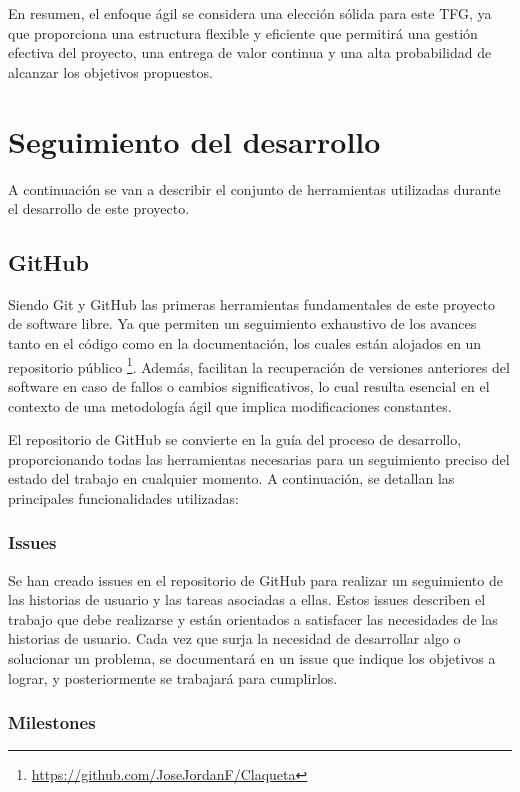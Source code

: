 En resumen, el enfoque ágil se considera una elección sólida para este TFG, ya que proporciona una estructura flexible y eficiente que permitirá una gestión efectiva del proyecto, una entrega de valor continua y una alta probabilidad de alcanzar los objetivos propuestos.


\section{Seguimiento del desarrollo}

A continuación se van a describir el conjunto de herramientas utilizadas durante el desarrollo de este proyecto.

\subsection{GitHub}

Siendo Git y GitHub las primeras herramientas fundamentales de este proyecto de software libre. Ya que permiten un seguimiento exhaustivo de los avances tanto en el código como en la documentación, los cuales están alojados en un repositorio público \footnote{\url{https://github.com/JoseJordanF/Claqueta}}. Además, facilitan la recuperación de versiones anteriores del software en caso de fallos o cambios significativos, lo cual resulta esencial en el contexto de una metodología ágil que implica modificaciones constantes.

El repositorio de GitHub se convierte en la guía del proceso de desarrollo, proporcionando todas las herramientas necesarias para un seguimiento preciso del estado del trabajo en cualquier momento. A continuación, se detallan las principales funcionalidades utilizadas:

\subsubsection{Issues}

Se han creado issues en el repositorio de GitHub para realizar un seguimiento de las historias de usuario y las tareas asociadas a ellas. Estos issues describen el trabajo que debe realizarse y están orientados a satisfacer las necesidades de las historias de usuario. Cada vez que surja la necesidad de desarrollar algo o solucionar un problema, se documentará en un issue que indique los objetivos a lograr, y posteriormente se trabajará para cumplirlos.

\subsubsection{Milestones}

